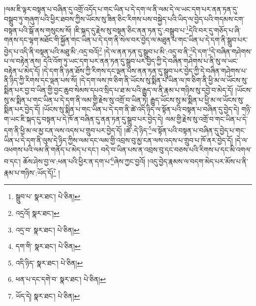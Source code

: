 །ལམ་ཇི་ལྟར་བསྟན་པ་བཞིན་དུ་འགྲོ་འདོད་པ་གང་ཡིན་པ་དེ་དག་ལ་ནི་ལམ་དེ་ལ་ཡང་དག་པར་ནན་ཏན་དུ་བསྒྲུབ་ཏུ་གཞུག་པའི་ཕྱིར་ཐབས་ཀྱིས་ཡོངས་སུ་ཟིན་ཅིང་རིགས་པས་བསྐྱེད་པའི་ཡིད་ལ་བྱེད་པའི་གདམས་ངག་བསྟན་པའི་སྒོ་ནས་གསུངས་སོ། །ཇི་སྐད་དུ་རྗེས་སུ་བསྟན་ཅིང་ནན་ཏན་དུ་:བསྒྲུབ་པ་\footnote{སྒྲུབ་པ་  སྣར་ཐང་།  པེ་ཅིན། }དེའི་བར་དུ་གཅོད་པ་ཞི་གནས་དང་ལྷག་མཐོང་གི་སྐྱོན་གང་ཡིན་པ་དེ་དག་ནི་སེལ་བར་བྱེད་ལ་མཐུན་པ་གང་ཡིན་པ་དེ་དག་ནི་སྒྲུབ་པར་བྱེད་པ་འདི་ནི་བསྟན་པའི་མཐུ་མི་:འདྲ་བའོ།\footnote{འདྲའོ།  སྣར་ཐང་། } །དེ་ལ་ནན་ཏན་དུ་སྒྲུབ་པ་མི་:འདྲ་བ་ནི་\footnote{འདྲ་བ་  སྣར་ཐང་།  པེ་ཅིན། }དེ་དག་\footnote{དག་གི་  སྣར་ཐང་།  པེ་ཅིན། }དེ་བཞིན་གཤེགས་པ་ལ་བརྟེན་ནས། དེའི་འོག་ཏུ་ཡང་དག་པར་ནན་ཏན་དུ་སྒྲུབ་པར་བྱེད་ཀྱི་དེ་བཞིན་གཤེགས་པ་ནི་སུ་ལ་ཡང་བརྟེན་པ་མེད་དོ། །དེ་དག་ནི་ཉན་ཐོས་ཀྱི་རིགས་དང་ལྡན་པས་ནན་ཏན་དུ་སྒྲུབ་པར་བྱེད་ཀྱི་དེ་བཞིན་གཤེགས་པ་ནི་ཉིད་ཀྱི་རིགས་དང་ལྡན་པས་སོ། །དེ་དག་ལས་ཁ་ཅིག་ནི་ཡོངས་སུ་སྨིན་པ་ཡིན་ལ་ཁ་ཅིག་ནི་ཕྱི་མ་ལ་ཡོངས་སུ་སྨིན་པར་བྱ་བ་ཡིན་གྱི་བྱང་ཆུབ་སེམས་དཔའ་སྲིད་པ་ཐ་མ་པའི་རྒྱུད་ལ་ནི་རྣམ་པ་གཉིས་སུ་དབྱེ་བ་མེད་དོ། །ཡོངས་སུ་མ་སྨིན་པ་གང་ཡིན་པ་དེ་དག་ནི་ལམ་གྱི་རྗེས་སུ་འགྲོ་བ་ཡིན་ཏེ། རྒྱུད་ཡོངས་སུ་མ་སྨིན་པ་ཕྱི་མ་ལ་ཡོངས་སུ་སྨིན་པར་བྱེད་དོ། །ཡོངས་སུ་སྨིན་པ་གང་ཡིན་པ་དེ་དག་ནི་ཚེ་འདི་ཉིད་ལ་སྟོན་པའི་བསྟན་པ་བཞིན་དུ་བྱེད་དེ། གཉི་ག་ཡང་ཇི་སྐད་དུ་བསྟན་པ་དེ་ཁོ་ན་བཞིན་དུ་ནན་ཏན་དུ་སྒྲུབ་པར་བྱེད་དེ། ལམ་གྱི་རྗེས་སུ་འགྲོ་བ་གང་ཡིན་པ་དེ་དག་ནི་ཕྱི་མ་ལ་མྱ་ངན་ལས་འདས་པ་གྲུབ་པར་བྱེད་དོ། །ཚེ་:དེ་ཉིད་\footnote{འདི་ཉིད་  སྣར་ཐང་།  པེ་ཅིན། }ལ་སྟོན་པའི་བསྟན་པ་བཞིན་དུ་བྱེད་པ་གང་ཡིན་པ་དེ་དག་ནི་ལུས་དེ་ཉིད་ཀྱིས་ལམ་དང་ལམ་གྱི་འབྲས་བུ་མྱ་ངན་ལས་འདས་པ་གྲུབ་པ་ཁོ་ནར་བྱེད་དོ། །དེ་ལ་འཕགས་པའི་ལམ་ནི་གནོད་པ་མེད་པ་དང་། བདེ་བ་ཡིན་པས་ན་འབྲས་བུ་དང་བཅས་པའི་རིགས་པ་དང་མི་འགལ་བ་དང་། ཆོས་ཤེས་བྱ་ལ་:ཕན་པའི་ཕྱིར་ན་དག་པ་\footnote{ཕན་པ་དང་དགེ་བ་  སྣར་ཐང་།  པེ་ཅིན། }ཞེས་ཀྱང་བྱའོ། །འདུ་བྱེད་རྣམས་ལ་བདག་མེད་པར་མོས་པ་ནི་རྣམ་པ་གཉིས་:ཡོད་དོ།\footnote{ཡོད་དེ།  སྣར་ཐང་།  པེ་ཅིན། } །
